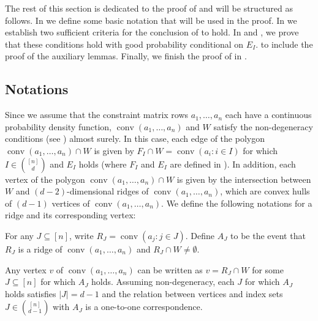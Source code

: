 \documentclass{article}\usepackage[a4paper,margin=20mm]{geometry}
\newcommand{\conv}{\operatorname{conv}}
\renewcommand{\subset}{\subseteq}
\begin{document}
The rest of this section is dedicated to the proof of  and will be structured as follows.
In  we define some basic notation that will be used in the proof.
In  we establish two sufficient criteria for the conclusion of  to hold.
In  and , we prove that these conditions hold with good probability conditional on $E_I$.
 to  include the proof of the auxiliary lemmas.
Finally, we finish the proof of  in .


\subsection{Notations}\label{sub:multi-notation}

Since we assume that the constraint matrix rows $a_1,\dots,a_n$ each have a continuous probability density function,
$\conv(a_1,\dots,a_n)$ and $W$ satisfy the non-degeneracy conditions (see ) almost surely.
In this case, each edge of the polygon $\conv(a_1, \ldots, a_n) \cap W$ is
given by $F_I \cap W = \conv(a_i: i\in I)$ for which $I \in \binom{[n]}{d}$ and $E_I$ holds
(where $F_I$ and $E_I$ are defined in ).  In addition, each vertex
of the polygon $\conv(a_1, \ldots, a_n) \cap W$ is given by the intersection
between $W$ and $(d-2)$-dimensional ridges of $\conv(a_1, \ldots, a_n)$, which
are convex hulls of $(d-1)$ vertices of $\conv(a_1, \ldots, a_n)$.
We define the following notations for a ridge and its corresponding vertex:

\begin{definition}\label{def:vertex-event}
    For any $J \subset [n]$, write $R_J = \conv(a_j : j\in J)$.
    Define $A_J$ to be the event that $R_J$ is a ridge of $\conv(a_1, \ldots, a_n)$
    and $R_J \cap W \neq \emptyset$.
\end{definition}

\begin{remark}
    Any vertex $v$ of $\conv(a_1,\dots,a_n)$ can be written as $v = R_J \cap W$
    for some $J \subset [n]$ for which $A_J$ holds.
    Assuming non-degeneracy, each $J$ for which $A_J$ holds satisfies $|J| = d-1$
    and the relation between vertices and index sets $J\in\binom{[n]}{d-1}$ with $A_J$
    is a one-to-one correspondence.
\end{remark}
\end{document}
